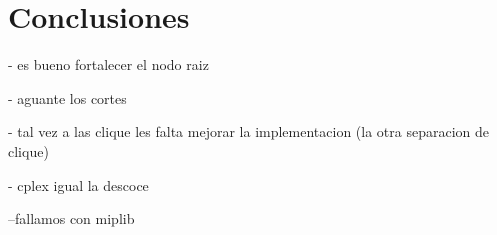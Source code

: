 \section{Conclusiones}

- es bueno fortalecer el nodo raiz

- aguante los cortes


- tal vez a las clique les falta mejorar la implementacion (la otra separacion de clique)



- cplex igual la descoce

--fallamos con miplib
